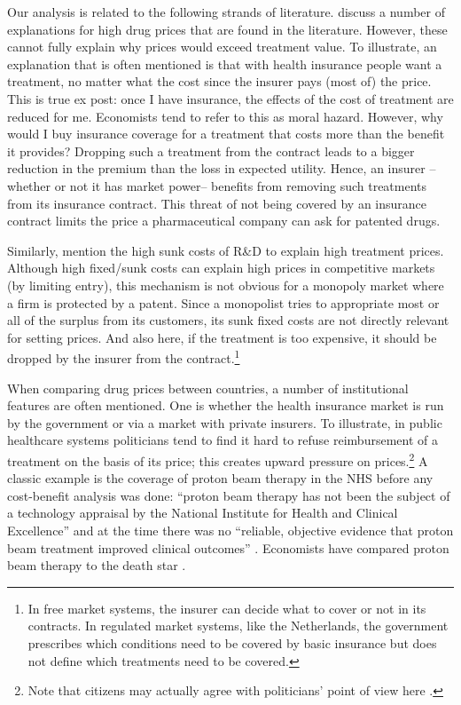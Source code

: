 \documentclass[a4paper,12pt]{article}
\begin{document}
Our analysis is related to the following strands of literature. \cite{Howard2015} discuss a number of explanations for high drug prices that are found in the literature. However,  these cannot fully explain why prices would exceed treatment value. To illustrate, an explanation that is often mentioned is that with health insurance people want a treatment, no matter what the cost since the insurer pays (most of) the price. This is true ex post: once I have insurance, the effects of the cost of treatment are reduced for me. Economists tend to refer to this as moral hazard. However, why would I buy insurance coverage for a treatment that costs more than the benefit it provides? Dropping such a treatment from the contract leads to a bigger reduction in the premium than the loss in expected utility. Hence, an insurer --whether or not it has market power-- benefits from removing such treatments from its insurance contract. This threat of not being covered by an insurance contract limits the price a pharmaceutical company can ask for patented drugs.

Similarly, \cite{Garrison2017} mention the high sunk costs of R\&D to explain high treatment prices. Although high fixed/sunk costs can explain high prices in competitive markets (by limiting entry), this mechanism is not obvious for a monopoly market where a firm is protected by a patent. Since a monopolist tries to appropriate most or all of the surplus from its customers, its sunk fixed costs are not directly relevant for setting prices. And also here, if the treatment is too expensive, it should be dropped by the insurer from the contract.\footnote{In free market systems, the insurer can decide what to cover or not in its contracts. In regulated market systems, like the Netherlands, the government prescribes which conditions need to be covered by basic insurance but does not define which treatments need to be covered.}

When comparing drug prices between countries, a number of institutional features are often mentioned. One is whether the health insurance market is run by the government or via a market with private insurers. To illustrate, in public healthcare systems politicians tend to find it hard to refuse reimbursement of a treatment on the basis of its price; this creates upward pressure on prices.\footnote{Note that citizens may actually agree with politicians' point of view here \citep{McCabe2005}.} A classic example is the coverage of proton beam therapy in the NHS before any cost-benefit analysis was done: ``proton beam therapy has not been the subject of a technology appraisal by the National Institute for Health and Clinical Excellence'' and at the time there was no ``reliable, objective evidence that proton beam treatment improved clinical outcomes'' \citep{Hawkese2627}. Economists have compared proton beam therapy to the death star \citep{Langreth2012}.
\end{document}

